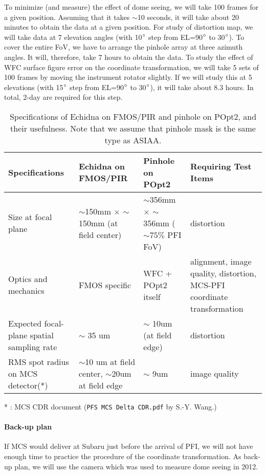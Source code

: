 To minimize (and measure) the effect of dome seeing, we will take 100 frames for a given position.
Assuming that it takes $\sim$10 seconds, it will take about 20 minutes to obtain the data at a given position.
For study of distortion map, we will take data at 7 elevation angles (with 10$^\circ$ step from EL=90$^\circ$ to 30$^\circ$).
To cover the entire FoV, we have to arrange the pinhole array at three azimuth angles.
It will, therefore, take 7 hours to obtain the data.
To study the effect of WFC surface figure error on the coordinate transformation, we will take 5 sets of 100 frames by moving the instrument rotator slightly.
If we will study this at 5 elevations (with 15$^\circ$ step from EL=90$^\circ$ to 30$^\circ$), it will take about 8.3 hours.
In total, 2-day are required for this step.

\begin{table}[!ht]
\begin{center}
\caption{Specifications of Echidna on FMOS/PIR and pinhole on POpt2, and their usefulness.
Note that we assume that pinhole mask is the same type as ASIAA.}
\label{tbl:fmos_pinhole}
\begin{tabular}{p{35mm}|*{3}{|p{40mm}}} \hline
Specifications	& Echidna on FMOS/PIR & Pinhole on POpt2 & Requiring Test Items\\ \hline \hline
Size at focal plane	& $\sim$150mm $\times$ $\sim$150mm (at field center)		& $\sim$356mm $\times$ $\sim$356mm ($\sim 75 \%$ PFI FoV)	& distortion \\ \hline
Optics and mechanics	& FMOS specific	& WFC + POpt2 itself	& alignment, image quality, distortion, MCS-PFI coordinate transformation \\  \hline
Expected focal-plane spatial sampling rate	& $\sim$ 35 um	& $\sim$ 10um (at field edge)	& distortion \\ \hline
RMS spot radius on MCS detector(*)	& $\sim$10 um at field center, $\sim$20um at field edge	& $\sim$ 9um	& image quality \\ \hline
\end{tabular} 
\end{center}
* : MCS CDR document ({\tt PFS MCS Delta CDR.pdf} by S.-Y. Wang.)
\end{table}

\paragraph{Back-up plan}
If MCS would deliver at Subaru just before the arrival of PFI, we will not have enough time to practice the procedure of the coordinate transformation.
As back-up plan, we will use the camera which was used to measure dome seeing in 2012.

